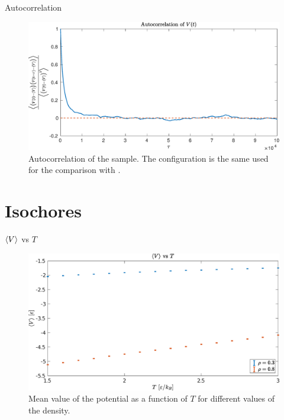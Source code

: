 \documentclass[10pt, compress, protectframetitle, handout]{beamer}
\begin{document}
\begin{frame}{Autocorrelation}
	\begin{figure}
		\centering
		\includegraphics[width=\textwidth]{autocorrelation_example}
		\caption{Autocorrelation of the sample. The configuration is the same used for the comparison with \cite{Johnson1993}.}
		\label{fig:autocorrelation_example}
	\end{figure}
\end{frame}


\section{Isochores}

\begin{frame}{$\Braket{V}$ vs $T$}
	\begin{figure}
		\centering
		\includegraphics[width=\textwidth]{V_vs_T}
		\caption{Mean value of the potential as a function of $T$ for different values of the density.}
		\label{fig:V_vs_T}
	\end{figure}
\end{frame}
\end{document}

